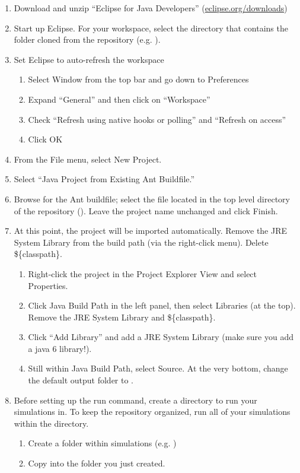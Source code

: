 \documentclass[11pt]{article}
\begin{document}
\begin{enumerate}
\item Download and unzip ``Eclipse for Java Developers'' (\href{http://www.eclipse.org/downloads/}{eclipse.org/downloads})
\item Start up Eclipse. For your workspace, select the directory that contains
  the  folder cloned from the repository (e.g. ).
\item Set Eclipse to auto-refresh the workspace
  \begin{enumerate}
  \item Select Window from the top bar and go down to Preferences
  \item Expand ``General'' and then click on ``Workspace''
  \item Check ``Refresh using native hooks or polling'' and ``Refresh on access''
  \item Click OK
  \end{enumerate}
  
\item From the File menu, select New Project.
\item Select ``Java Project from Existing Ant Buildfile.''
\item Browse for the Ant buildfile; select the  file located in
  the top level directory of the repository
  (). Leave the project name unchanged and
  click Finish.
\item At this point, the project will be imported automatically. Remove the JRE
  System Library from the build path (via the right-click menu). Delete
  \$\{classpath\}.
  \begin{enumerate}
  \item Right-click the project in the Project Explorer View and select
    Properties.
  \item Click Java Build Path in the left panel, then select Libraries (at the
    top). Remove the JRE System Library and \$\{classpath\}.
  \item Click ``Add Library'' and add a JRE System Library (make sure you add a
    java 6 library!).
  \item Still within Java Build Path, select Source. At the very bottom, change
    the default output folder to .
  \end{enumerate}

\item Before setting up the run command, create a directory to run your
  simulations in.  To keep the repository organized, run all of your simulations
  within the  directory.
  \begin{enumerate}
  \item Create a folder within simulations (e.g. )
  \item Copy  into the folder you just created.
  \end{enumerate}


\end{enumerate}
\end{document}
